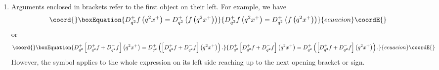 \documentclass[a4paper,11pt,oneside]{article}
\begin{document}
\begin{enumerate}
\item  Arguments enclosed in brackets refer to the first object on their
left. For example, we have 
\begin{equation}\coord{}\boxEquation{
D_{q^{2}}^{+}f\left( q^{2}x^{+}\right) =D_{q^{2}}^{+}\left( f\left(
q^{2}x^{+}\right) \right)
}{
D_{q^{2}}^{+}f\left( q^{2}x^{+}\right) =D_{q^{2}}^{+}\left( f\left(
q^{2}x^{+}\right) \right)
}{ecuacion}\coordE{}\end{equation}
or 
\begin{equation}\coord{}\boxEquation{
D_{q^{2}}^{+}\left[ D_{q^{2}}^{+}f+D_{q^{2}}^{-}f\right] \left(
q^{2}x^{+}\right) =D_{q^{2}}^{+}\left( \left[
D_{q^{2}}^{+}f+D_{q^{2}}^{-}f\right] \left( q^{2}x^{+}\right) \right) .
}{
D_{q^{2}}^{+}\left[ D_{q^{2}}^{+}f+D_{q^{2}}^{-}f\right] \left(
q^{2}x^{+}\right) =D_{q^{2}}^{+}\left( \left[
D_{q^{2}}^{+}f+D_{q^{2}}^{-}f\right] \left( q^{2}x^{+}\right) \right) .
}{ecuacion}\coordE{}\end{equation}
However, the symbol \coordHE{} applies to the whole
expression on its left side reaching up to the next opening bracket or \myHighlight{$\pm $}\coordHE{}
sign.


\end{enumerate}
\end{document}
